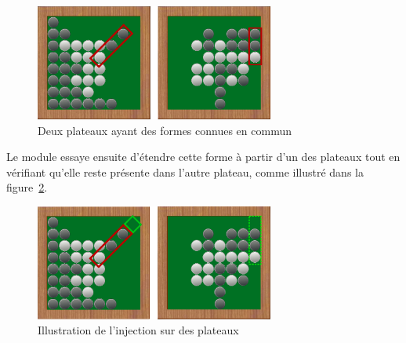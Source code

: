 \begin{figure}[H] 
\begin{center}
\includegraphics[width=0.7\textwidth]{files/raisonneur/cbs_reco1} 
\end{center}
\caption{Deux plateaux ayant des formes connues en commun} 
\label{img_cbs_reco1}
\end{figure}

Le module essaye ensuite d'étendre cette forme à partir d'un des plateaux tout en vérifiant qu'elle reste présente dans l'autre plateau, comme illustré dans la figure~\ref{img_cbs_reco_forme_injection}.

\begin{figure}[H] 
\begin{center}
\includegraphics[width=0.7\textwidth]{files/raisonneur/cbs_reco3} 
\end{center}
\caption{Illustration de l'injection sur des plateaux} 
\label{img_cbs_reco_forme_injection}
\end{figure}
